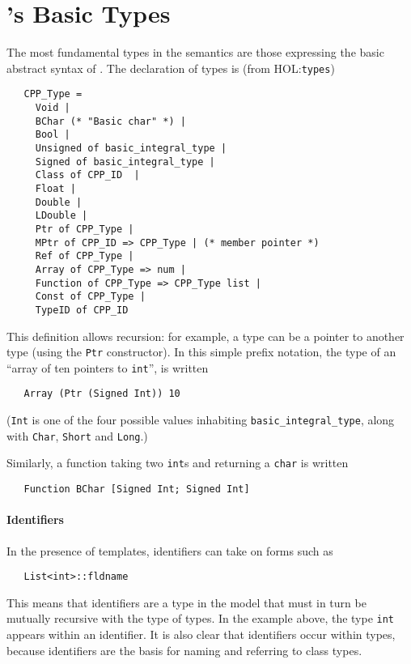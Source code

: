 \documentclass[11pt]{article}
\newcommand{\HOLfile}[1]{HOL:\texttt{#1}}
\begin{document}
\section{\cpp's Basic Types}
\label{sec:basic-types}

The most fundamental types in the semantics are those expressing the
basic abstract syntax of \cpp{}.  The declaration of \cpp{} types is
(from \HOLfile{types})
\begin{verbatim}
   CPP_Type =
     Void |
     BChar (* "Basic char" *) |
     Bool |
     Unsigned of basic_integral_type |
     Signed of basic_integral_type |
     Class of CPP_ID  |
     Float |
     Double |
     LDouble |
     Ptr of CPP_Type |
     MPtr of CPP_ID => CPP_Type | (* member pointer *)
     Ref of CPP_Type |
     Array of CPP_Type => num |
     Function of CPP_Type => CPP_Type list |
     Const of CPP_Type |
     TypeID of CPP_ID
\end{verbatim}
This definition allows recursion: for example, a \cpp{} type can be a
pointer to another \cpp{} type (using the \texttt{Ptr}
constructor).  In this simple prefix notation, the type of an
``array of ten pointers to \texttt{int}'', is written
\begin{verbatim}
   Array (Ptr (Signed Int)) 10
\end{verbatim}
(\texttt{Int} is one of the four possible values inhabiting
\texttt{basic_integral_type}, along with \texttt{Char}, \texttt{Short}
and \texttt{Long}.)

Similarly, a function taking two \texttt{int}s and returning a
\texttt{char} is written
\begin{verbatim}
   Function BChar [Signed Int; Signed Int]
\end{verbatim}

\paragraph{Identifiers}
In the presence of templates, identifiers can take on forms such as
\begin{verbatim}
   List<int>::fldname
\end{verbatim}

This means that identifiers are a type in the model that must in turn
be mutually recursive with the type of types.  In the example above,
the type \texttt{int} appears within an identifier.  It is also clear
that identifiers occur within types, because identifiers are the basis
for naming and referring to class types.
\end{document}
